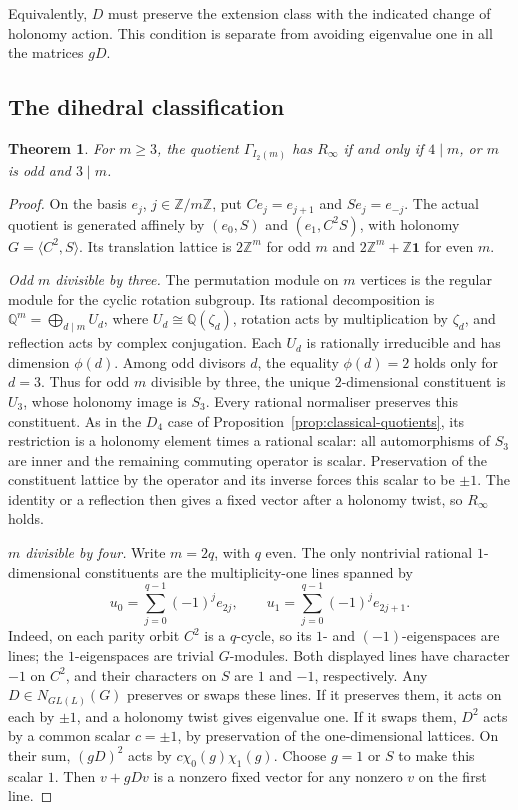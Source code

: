 \documentclass[11pt]{article}
\newtheorem{theorem}{Theorem}[section]
\theoremstyle{definition}
\newcommand{\Z}{\mathbb{Z}}
\newcommand{\Q}{\mathbb{Q}}
\newcommand{\Rinf}{R_\infty}
\begin{document}
Equivalently, $D$ must preserve the extension class with the indicated change of holonomy action.
This condition is separate from avoiding eigenvalue one in all the matrices $gD$.

\subsection{The dihedral classification}\label{sec:dihedral-classification}

\begin{theorem}\label{thm:dihedral-classification}
For $m\ge3$, the quotient $\Gamma_{I_2(m)}$ has $\Rinf$ if and only if $4\mid m$, or $m$ is odd and $3\mid m$.
\end{theorem}
\begin{proof}
On the basis $e_j$, $j\in\Z/m\Z$, put $Ce_j=e_{j+1}$ and $Se_j=e_{-j}$.
The actual quotient is generated affinely by $(e_0,S)$ and $(e_1,C^2S)$, with holonomy
$G=\langle C^2,S\rangle$. Its translation lattice is $2\Z^m$ for odd $m$ and
$2\Z^m+\Z\mathbf1$ for even $m$.

\emph{Odd $m$ divisible by three.} The permutation module on $m$ vertices is the regular module for the cyclic rotation subgroup.
Its rational decomposition is $\Q^m=\bigoplus_{d\mid m}U_d$, where $U_d\cong\Q(\zeta_d)$,
rotation acts by multiplication by $\zeta_d$, and reflection acts by complex conjugation.
Each $U_d$ is rationally irreducible and has dimension $\phi(d)$.
Among odd divisors $d$, the equality $\phi(d)=2$ holds only for $d=3$.
Thus for odd $m$ divisible by three, the unique $2$-dimensional constituent is $U_3$, whose holonomy image is $S_3$.
Every rational normaliser preserves this constituent. As in the $D_4$ case of
Proposition~\ref{prop:classical-quotients}, its restriction is a holonomy element times a rational scalar:
all automorphisms of $S_3$ are inner and the remaining commuting operator is scalar.
Preservation of the constituent lattice by the operator and its inverse forces this scalar to be $\pm1$.
The identity or a reflection then gives a fixed vector after a holonomy twist, so $\Rinf$ holds.

\emph{$m$ divisible by four.} Write $m=2q$, with $q$ even. The only nontrivial rational
$1$-dimensional constituents are the multiplicity-one lines spanned by
\[
 u_0=\sum_{j=0}^{q-1}(-1)^j e_{2j},\qquad
 u_1=\sum_{j=0}^{q-1}(-1)^j e_{2j+1}.
\]
Indeed, on each parity orbit $C^2$ is a $q$-cycle, so its $1$- and $(-1)$-eigenspaces are lines;
the $1$-eigenspaces are trivial $G$-modules. Both displayed lines have character $-1$ on $C^2$,
and their characters on $S$ are $1$ and $-1$, respectively.
Any $D\in N_{GL(L)}(G)$ preserves or swaps these lines. If it preserves them, it acts on each by $\pm1$,
and a holonomy twist gives eigenvalue one. If it swaps them, $D^2$ acts by a common scalar $c=\pm1$,
by preservation of the one-dimensional lattices. On their sum, $(gD)^2$ acts by
$c\chi_0(g)\chi_1(g)$. Choose $g=1$ or $S$ to make this scalar $1$.
Then $v+gDv$ is a nonzero fixed vector for any nonzero $v$ on the first line.


\end{proof}
\end{document}
